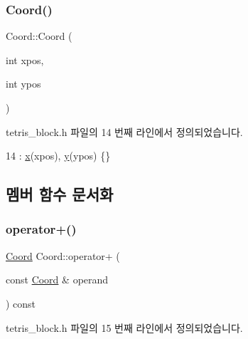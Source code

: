 \subsubsection{\texorpdfstring{Coord()}{Coord()}\hspace{0.1cm}{\footnotesize\ttfamily [2/2]}}
{\footnotesize\ttfamily Coord\+::\+Coord (\begin{DoxyParamCaption}\item[{int}]{xpos,  }\item[{int}]{ypos }\end{DoxyParamCaption})\hspace{0.3cm}{\ttfamily [inline]}}



tetris\+\_\+block.\+h 파일의 14 번째 라인에서 정의되었습니다.


\begin{DoxyCode}
14 : \mbox{\hyperlink{struct_coord_a696eaa744360fc791d0e3b331c549dbe}{x}}(xpos), \mbox{\hyperlink{struct_coord_a214166cca70cef7dda9201689c3e81ab}{y}}(ypos) \{\}
\end{DoxyCode}


\subsection{멤버 함수 문서화}
\mbox{\label{struct_coord_ad564b77330c90986e1586d2d04aad6f9}} 
\subsubsection{\texorpdfstring{operator+()}{operator+()}}
{\footnotesize\ttfamily \mbox{\hyperlink{struct_coord}{Coord}} Coord\+::operator+ (\begin{DoxyParamCaption}\item[{const \mbox{\hyperlink{struct_coord}{Coord}} \&}]{operand }\end{DoxyParamCaption}) const\hspace{0.3cm}{\ttfamily [inline]}}



tetris\+\_\+block.\+h 파일의 15 번째 라인에서 정의되었습니다.


